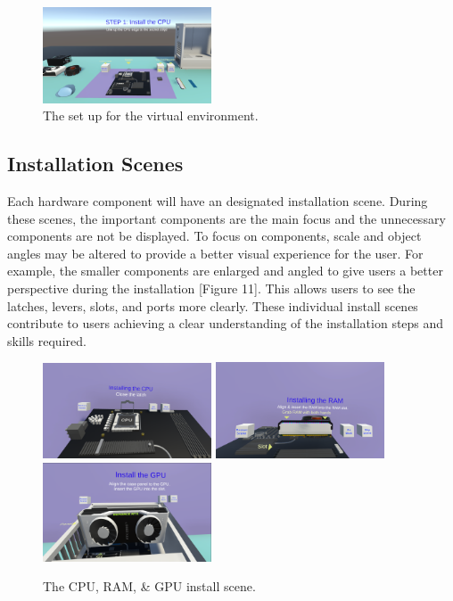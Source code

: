 \documentclass[10pt,twocolumn]{article}
\begin{document}
\begin{figure}
    \centering
    \includegraphics[width=5cm]{images/SetUp.png}
    \caption{The set up for the virtual environment.}
\end{figure}

\subsection{Installation Scenes}

\par Each hardware component will have an designated installation scene. During these scenes, the important components are the main focus and the unnecessary components are not be displayed. To focus on components, scale and object angles may be altered to provide a better visual experience for the user. For example, the smaller components are enlarged and angled to give users a better perspective during the installation [Figure 11]. This allows users to see the latches, levers, slots, and ports more clearly. These individual install scenes contribute to users achieving a clear understanding of the installation steps and skills required.  

\begin{figure}
    \centering
    \includegraphics[width=5cm]{images/CPUInstallScene.png}
    \includegraphics[width=5cm]{images/RAMInstallScene.png}
    \includegraphics[width=5cm]{images/GPUInstallScene.png}
    \caption{The CPU, RAM, \& GPU install scene.}
\end{figure}
\end{document}
